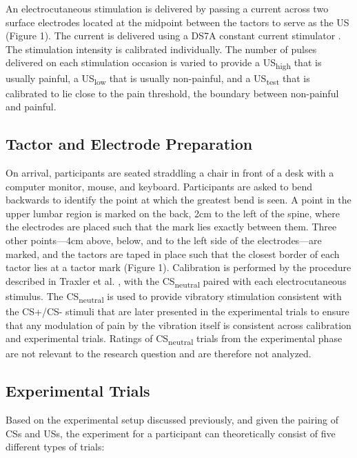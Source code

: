 \documentclass[empirical,issue, twocolumn,authordate]{jote-new-article}
\begin{document}
An electrocutaneous stimulation is delivered by passing a current across two surface electrodes located at the midpoint between the tactors to serve as the US (Figure 1). The current is delivered using a DS7A constant current stimulator \parencite{Digitimer}. The stimulation intensity is calibrated individually. The number of pulses delivered on each stimulation occasion is varied to provide a US\textsubscript{high} that is usually painful, a US\textsubscript{low} that is usually non-painful, and a US\textsubscript{test} that is calibrated to lie close to the pain threshold, the boundary between non-painful and painful.

\subsection{Tactor and Electrode Preparation}

On arrival, participants are seated straddling a chair in front of a desk with a computer monitor, mouse, and keyboard. Participants are asked to bend backwards to identify the point at which the greatest bend is seen. A point in the upper lumbar region is marked on the back, 2cm to the left of the spine, where the electrodes are placed such that the mark lies exactly between them. Three other points—4cm above, below, and to the left side of the electrodes—are marked, and the tactors are taped in place such that the closest border of each tactor lies at a tactor mark (Figure 1). Calibration is performed by the procedure described in Traxler et al. \parencite{Traxler2019}, with the CS\textsubscript{neutral} paired with each electrocutaneous stimulus. The CS\textsubscript{neutral} is used to provide vibratory stimulation consistent with the CS+/CS- stimuli that are later presented in the experimental trials to ensure that any modulation of pain by the vibration itself is consistent across calibration and experimental trials. Ratings of CS\textsubscript{neutral} trials from the experimental phase are not relevant to the research question and are therefore not analyzed.

\subsection{Experimental Trials}

Based on the experimental setup discussed previously, and given the pairing of CSs and USs, the experiment for a participant can theoretically consist of five different types of trials:
\end{document}
